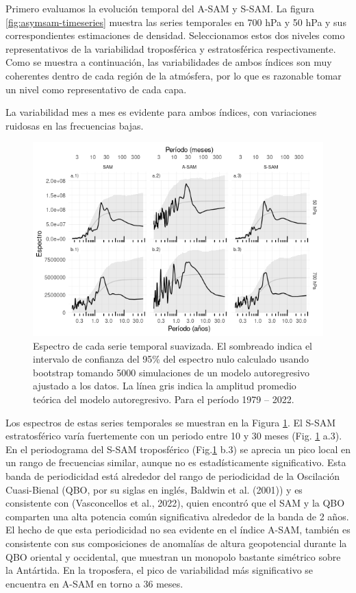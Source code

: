 \documentclass[12pt,oneside]{reedthesis}
\begin{document}
Primero evaluamos la evolución temporal del A-SAM y S-SAM.
La figura \ref{fig:asymsam-timeseries} muestra las series temporales en 700 hPa y 50 hPa y sus correspondientes estimaciones de densidad.
Seleccionamos estos dos niveles como representativos de la variabilidad troposférica y estratosférica respectivamente.
Como se muestra a continuación, las variabilidades de ambos índices son muy coherentes dentro de cada región de la atmósfera, por lo que es razonable tomar un nivel como representativo de cada capa.

La variabilidad mes a mes es evidente para ambos índices, con variaciones ruidosas en las frecuencias bajas.






\begin{figure}
\includegraphics{figures/30-sam/spectrum-1} \caption{Espectro de cada serie temporal suavizada.
El sombreado indica el intervalo de confianza del 95\% del espectro nulo calculado usando bootstrap tomando 5000 simulaciones de un modelo autoregresivo ajustado a los datos.
La línea gris indica la amplitud promedio teórica del modelo autoregresivo.
Para el período 1979 -- 2022.}\label{fig:spectrum}
\end{figure}

Los espectros de estas series temporales se muestran en la Figura \ref{fig:spectrum}.
El S-SAM estratosférico varía fuertemente con un periodo entre 10 y 30 meses (Fig. \ref{fig:spectrum} a.3).
En el periodograma del S-SAM troposférico (Fig.\ref{fig:spectrum} b.3) se aprecia un pico local en un rango de frecuencias similar, aunque no es estadísticamente significativo.
Esta banda de periodicidad está alrededor del rango de periodicidad de la Oscilación Cuasi-Bienal (QBO, por su siglas en inglés, Baldwin et al. (2001)) y es consistente con (Vasconcellos et al., 2022), quien encontró que el SAM y la QBO comparten una alta potencia común significativa alrededor de la banda de 2 años.
El hecho de que esta periodicidad no sea evidente en el índice A-SAM, también es consistente con sus composiciones de anomalías de altura geopotencial durante la QBO oriental y occidental, que muestran un monopolo bastante simétrico sobre la Antártida.
En la troposfera, el pico de variabilidad más significativo se encuentra en A-SAM en torno a 36 meses.
\end{document}
